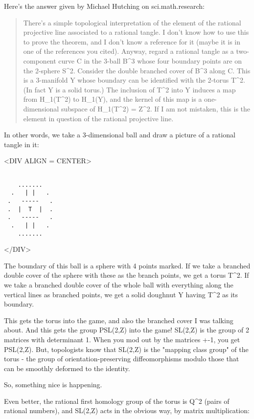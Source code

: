 Here's the answer given by Michael Hutching on sci.math.research:

\begin{quote}
 There's a simple topological interpretation of the element of the
 rational projective line associated to a rational tangle.  I don't know
 how to use this to prove the theorem, and I don't know a reference for
 it (maybe it is in one of the references you cited).  Anyway, regard a
 rational tangle as a two-component curve C in the 3-ball B^{3} 
  whose four
 boundary points are on the 2-sphere S^{2}.  
 Consider the double branched
 cover of B^{3} along C.  This is a 3-manifold Y whose boundary can be
 identified with the 2-torus T^{2}.  (In fact Y is a solid torus.)  The
 inclusion of T^{2} into Y induces a map from 
 H_{1}(T^{2}) to H_{1}(Y), and the
 kernel of this map is a one-dimensional subspace of H_{1}(T^{2}) = Z^{2}.  If
 I am not mistaken, this is the element in question of the rational
 projective line. 
\end{quote}

In other words, we take a 3-dimensional ball and draw a picture
of a rational tangle in it:

<DIV ALIGN = CENTER>

\begin{verbatim}

    .......   
  .   | |   . 
 .   -----   .
 .  |  T  |  .
 .   -----   .
  .   | |   . 
    .......   
\end{verbatim}
    
</DIV>

The boundary of this ball is a sphere with 4 points marked.  If we 
take a branched double cover of the sphere with these as the branch
points, we get a torus T^{2}.   If we take a branched double cover of 
the whole ball with everything along the vertical lines as branched 
points, we get a solid doughnut Y having T^{2} as its boundary.  

This gets the torus into the game, and also the branched cover I was 
talking about.  And this gets the group PSL(2,Z) into the game!  
SL(2,Z) is the group of 2 matrices with determinant 1.  When you 
mod out by the matrices +-1, you get PSL(2,Z).  But, topologists know 
that SL(2,Z) is the "mapping class group" of the torus - the 
group of 
orientation-preserving diffeomorphisms modulo those that can be 
smoothly deformed to the identity.

So, something nice is happening.  

Even better, the rational first homology group of the torus is Q^{2}
(pairs of rational numbers), and SL(2,Z) acts in the obvious way, 
by matrix multiplication:
  

